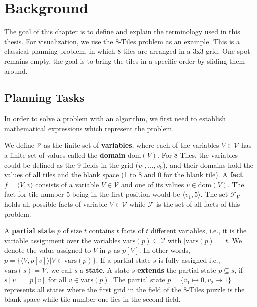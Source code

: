 
\chapter{Background}\label{ch:background}

The goal of this chapter is to define and explain the terminology used in this thesis.
For visualization, we use the 8-Tiles problem as an example.
This is a classical planning problem, in which 8 tiles are arranged in a 3x3-grid.
One spot remains empty, the goal is to bring the tiles in a specific order by sliding them around.

\section {Planning Tasks}\label{sec:planning-tasks}
In order to solve a problem with an algorithm, we first need to establish mathematical expressions which represent the problem.

We define $\mathcal{V}$ as the finite set of \textbf{variables}, where each of the variables $V\in\mathcal{V}$ has a finite set of values called the \textbf{domain} $\text{dom}(V)$.
For 8-Tiles, the variables could be defined as the 9 fields in the grid ($v_1,\dots,v_9$), and their domains hold the values of all tiles and the blank space (1 to 8 and 0 for the blank tile).
A \textbf{fact} $f=\langle V, v\rangle$ consists of a variable $V\in\mathcal{V}$ and one of its values $v\in\text{dom}(V)$.
The fact for tile number 5 being in the first position would be $\langle v_1,5\rangle$.
The set $\mathcal{F}_V$ holds all possible facts of variable $V\in\mathcal{V}$ while $\mathcal{F}$ is the set of all facts of this problem.

A \textbf{partial state} $p$ of size $t$ contains $t$ facts of $t$ different variables, i.e., it is the variable assignment over the variables $\text{vars}(p)\subseteq\mathcal{V}$ with $|\text{vars}(p)|=t$.
We denote the value assigned to $V$ in $p$ as $p[V]$.
In other words, $p=\{\langle V, p[v] \rangle | V\in\text{vars}(p)\}$.
If a partial state $s$ is fully assigned i.e., $\text{vars}(s)=\mathcal{V}$, we call $s$ a \textbf{state}.
A state $s$ \textbf{extends} the partial state $p\subseteq s$, if $s[v] = p[v]$ for all $v \in\text{vars}(p)$.
The partial state $p = \{v_1\mapsto0, v_2\mapsto1\}$ represents all states where the first grid in the field of the 8-Tiles puzzle is the blank space while tile number one lies in the second field.

